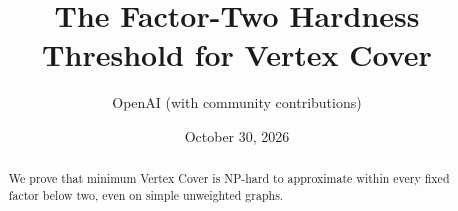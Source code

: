 \documentclass[11pt]{article}
\title{The Factor-Two Hardness Threshold for Vertex Cover}
\author{OpenAI (with community contributions)}
\date{October 30, 2026}
\numberwithin{equation}{section}
\theoremstyle{definition}
\theoremstyle{remark}
\begin{document}
\maketitle
\begin{abstract}
We prove that minimum Vertex Cover is NP-hard to approximate within
every fixed factor below two, even on simple unweighted graphs.
\end{abstract}













\end{document}

